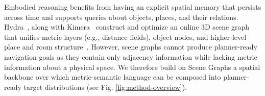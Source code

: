 Embodied reasoning benefits from having an explicit spatial memory that persists across time and supports queries about objects, places, and their relations. Hydra~\cite{hydra}, along with Kimera~\cite{rosinol2020kimeraopensourcelibraryrealtime} construct and optimize an online $3$D scene graph that unifies metric layers (e.g., distance fields), object nodes, and higher-level place and room structure~\cite{hydra}.
However, scene graphs cannot produce planner-ready navigation goals as they contain only adjacency information while lacking metric information about a physical space. We therefore build on Scene Graphs a spatial backbone over which metric-semantic language can be composed into planner-ready target distributions (see Fig. \ref{fig:method-overview}).

